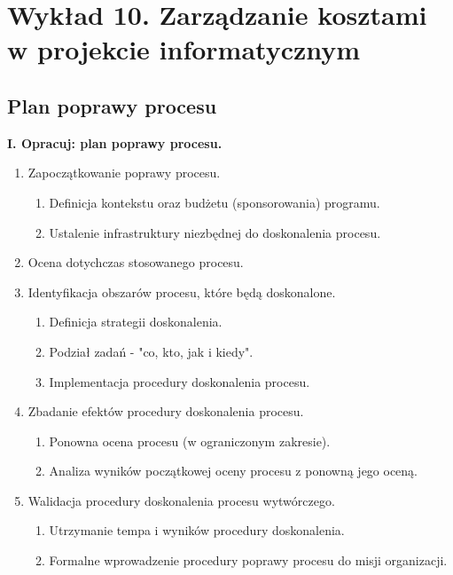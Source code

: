 ﻿\chapter{Wykład 10. Zarządzanie kosztami w projekcie informatycznym}

\section{Plan poprawy procesu}

\textbf{I. Opracuj: plan poprawy procesu.}

\begin{enumerate}
\item Zapoczątkowanie poprawy procesu.
\begin{enumerate}

\item Definicja kontekstu oraz budżetu (sponsorowania) programu.
\item Ustalenie infrastruktury niezbędnej do doskonalenia procesu.
\end{enumerate}


\item Ocena dotychczas stosowanego procesu.
\item Identyfikacja obszarów procesu, które będą doskonalone.
\begin{enumerate}

\item Definicja strategii doskonalenia.
\item Podział zadań - "co, kto, jak i kiedy".
\item Implementacja procedury doskonalenia procesu.
\end{enumerate}


\item Zbadanie efektów procedury doskonalenia procesu.
\begin{enumerate}

\item Ponowna ocena procesu (w ograniczonym zakresie).
\item Analiza wyników początkowej oceny procesu z ponowną jego oceną.
\end{enumerate}

\item Walidacja procedury doskonalenia procesu wytwórczego.
\begin{enumerate}

\item Utrzymanie tempa i wyników procedury doskonalenia.
\item Formalne wprowadzenie procedury poprawy procesu do misji organizacji.

\end{enumerate}
\end{enumerate}



